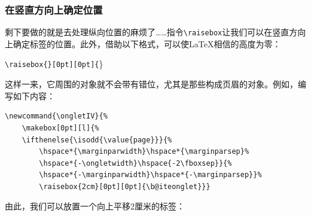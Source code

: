 \subsubsection{在竖直方向上确定位置}

剩下要做的就是去处理纵向位置的麻烦了……指令\verb|\raisebox|让我们可以在竖直方向上确定标签的位置。此外，借助以下格式，可以使\LaTeX 相信的高度为零：

\begin{dmd}
\verb|\raisebox{|\verb|}[0pt][0pt]{|\}
\end{dmd}

这样一来，它周围的对象就不会带有错位，尤其是那些构成页眉的对象。例如，编写如下内容：

\begin{dmd}
\begin{verbatim}
\newcommand{\ongletIV}{% 
    \makebox[0pt][l]{% 
    \ifthenelse{\isodd{\value{page}}}{%
        \hspace*{\marginparwidth}\hspace*{\marginparsep}% 
        \hspace*{-\ongletwidth}\hspace{-2\fboxsep}}{% 
        \hspace*{-\marginparwidth}\hspace*{-\marginparsep}}% 
        \raisebox{2cm}[0pt][0pt]{\b@iteonglet}}}\end{verbatim}
\end{dmd}

由此，我们可以放置一个向上平移2厘米的标签：

\newcommand{\ongletIV}{%
    \makebox[0pt][l]{%
    \ifthenelse{\isodd{\value{page}}}{%
        \hspace*{\marginparwidth}\hspace*{\marginparsep}%
        \hspace*{-\ongletwidth}\hspace{-2\fboxsep}}{%
        \hspace*{-\marginparwidth}\hspace*{-\marginparsep}}%
        \raisebox{2cm}[0pt][0pt]{\biteonglet}}}

\ifthenelse{\isodd{\value{page}}}{%
  \begin{flushright}
    \bfseries\thepage\ongletIV\\[-10pt]
    \rule{\textwidth}{.4pt}
  \end{flushright}}{%
  \begin{flushleft}
  \ongletIV\bfseries\thepage\\[-10pt]
    \rule{\textwidth}{.4pt}
  \end{flushleft}}

